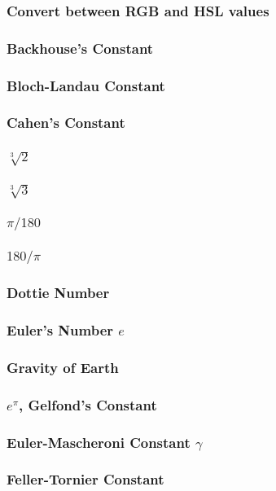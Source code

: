 \documentclass[10pt,a4paper]{report}
\begin{document}
			\subsubsection{Convert between RGB and HSL values}
			\subsubsection{Backhouse’s Constant}
			\subsubsection{Bloch-Landau Constant}
			\subsubsection{Cahen's Constant}
			\subsubsection{$\sqrt[3]{2}$}
			\subsubsection{$\sqrt[3]{3}$}
			\subsubsection{$\pi / 180$}
			\subsubsection{$180 / \pi$}
			\subsubsection{Dottie Number}
			\subsubsection{Euler's Number $e$}
			\subsubsection{Gravity of Earth}
			\subsubsection{$e^{\pi}$, Gelfond's Constant}
			\subsubsection{Euler-Mascheroni Constant $\gamma$}
			\subsubsection{Feller-Tornier Constant}
\end{document}
